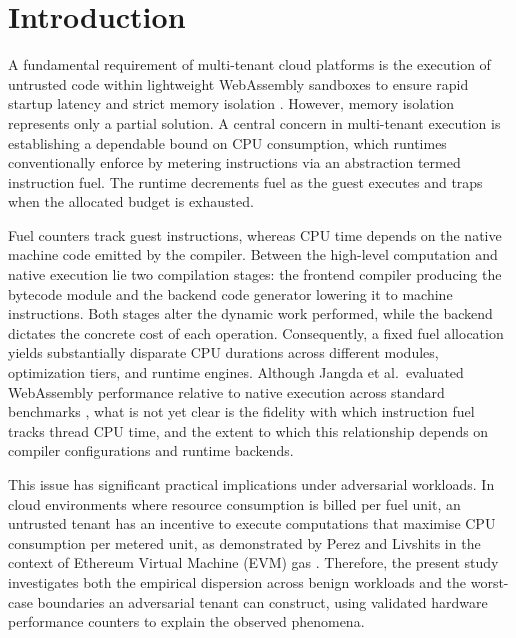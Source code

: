 \documentclass{ws-jcsc}
\begin{document}


\section{Introduction}
\label{sec:intro}
A fundamental requirement of multi-tenant cloud platforms is the execution of untrusted code within lightweight WebAssembly sandboxes to ensure rapid startup latency and strict memory isolation \cite{haas2017bringing, shillaker2020faasm}. However, memory isolation represents only a partial solution. A central concern in multi-tenant execution is establishing a dependable bound on CPU consumption, which runtimes conventionally enforce by metering instructions via an abstraction termed instruction fuel. The runtime decrements fuel as the guest executes and traps when the allocated budget is exhausted.

Fuel counters track guest instructions, whereas CPU time depends on the native machine code emitted by the compiler. Between the high-level computation and native execution lie two compilation stages: the frontend compiler producing the bytecode module and the backend code generator lowering it to machine instructions. Both stages alter the dynamic work performed, while the backend dictates the concrete cost of each operation. Consequently, a fixed fuel allocation yields substantially disparate CPU durations across different modules, optimization tiers, and runtime engines. Although Jangda et al.\ evaluated WebAssembly performance relative to native execution across standard benchmarks \cite{jangda2019not}, what is not yet clear is the fidelity with which instruction fuel tracks thread CPU time, and the extent to which this relationship depends on compiler configurations and runtime backends.

This issue has significant practical implications under adversarial workloads. In cloud environments where resource consumption is billed per fuel unit, an untrusted tenant has an incentive to execute computations that maximise CPU consumption per metered unit, as demonstrated by Perez and Livshits in the context of Ethereum Virtual Machine (EVM) gas \cite{perez2020broken}. Therefore, the present study investigates both the empirical dispersion across benign workloads and the worst-case boundaries an adversarial tenant can construct, using validated hardware performance counters to explain the observed phenomena.
\end{document}
